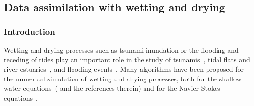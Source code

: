 \documentclass[prodmode,acmtoms]{acmsmall}
\begin{document}
\subsection{Data assimilation with wetting and drying}
\subsubsection{Introduction}
Wetting and drying processes such as tsunami inundation or the flooding and receding of tides play an important role 
in the study of tsunamis~\cite{kowalik2004}, tidal flats and river estuaries~\cite{zhang2009,xue2010}, and flooding events~\cite{westerink2008,song2010}.
Many algorithms have been proposed for the numerical simulation of wetting and drying processes, 
both for the shallow water equations~( and the references therein) and for the Navier-Stokes equations~\cite{funke2011}.
\end{document}
